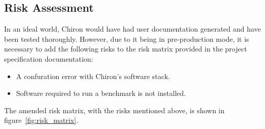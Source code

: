 \documentclass[12pt,a4paper]{article}
\begin{document}
        \subsection{Risk Assessment}
        \label{sub:risk_assessment}

            In an ideal world, Chiron would have had user documentation generated and have been tested thoroughly. However, due to it being in pre-production mode, it is necessary to add the following risks to the risk matrix provided in the project specification documentation:

            \begin{itemize}
                \item A confuration error with Chiron's software stack.
                \item Software required to run a benchmark is not installed.
            \end{itemize}

            The amended risk matrix, with the risks mentioned above, is shown in figure~\ref{fig:risk_matrix}.
\end{document}
